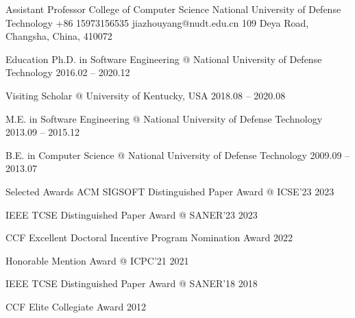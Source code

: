 \documentclass{resume}
\begin{document}
\vspace{-1em}

\begin{rSubsection}
    {Assistant Professor}
    {College of Computer Science}
    {National University of Defense Technology}
    {+86 15973156535}
    {jiazhouyang@nudt.edu.cn}
    {109 Deya Road, Changsha, China, 410072}
\end{rSubsection}

\begin{rSection}{Education}
    {Ph.D. in Software Engineering @ National University of Defense Technology} \hfill {2016.02 -- 2020.12}

    {Visiting Scholar @ University of Kentucky, USA} \hfill {2018.08 -- 2020.08}

    {M.E. in Software Engineering @ National University of Defense Technology} \hfill {2013.09 -- 2015.12}

    {B.E. in Computer Science @ National University of Defense Technology} \hfill {2009.09 -- 2013.07}
\end{rSection}

\begin{rSection}{Selected Awards}
    {ACM SIGSOFT Distinguished Paper Award @ ICSE'23} \hfill {2023}

    {IEEE TCSE Distinguished Paper Award @ SANER'23} \hfill {2023}

    {CCF Excellent Doctoral Incentive Program Nomination Award} \hfill {2022}

    {Honorable Mention Award @ ICPC'21} \hfill {2021}

    {IEEE TCSE Distinguished Paper Award @ SANER'18} \hfill {2018}

    {CCF Elite Collegiate Award} \hfill {2012}
\end{rSection}
\end{document}
